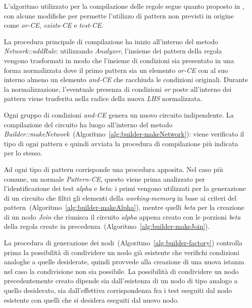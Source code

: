 L'algoritmo utilizzato per la compilazione delle regole segue quanto proposto in \cite{Doorenbos95productionmatching}, con alcune modifiche per permette l'utilizzo di pattern non previsti in origine come \emph{or-CE}, \emph{exists-CE} e \emph{test-CE}.

La procedura principale di compilazione ha inizio all'interno del metodo \emph{Network::addRule}: utilizzando \emph{Analyzer}, l'insieme dei pattern della regola vengono trasformati in modo che l'insieme di condizioni sia presentato in una forma normalizzata dove il primo pattern sia un elemento \emph{or-CE} con al suo interno almeno un elemento \emph{and-CE} che racchiuda le condizioni originali. Durante la normalizzazione, l'eventuale presenza di condizioni \emph{or} poste all'interno dei pattern viene trasferita nella radice della nuova \emph{LHS} normalizzata.



Ogni gruppo di condizioni \emph{and-CE} genera un nuovo circuito indipendente. La compilazione del circuito ha luogo all'interno del metodo \emph{Builder::makeNetwork}~(Algoritmo~\ref{alg:builder-makeNetwork}): viene verificato il tipo di ogni pattern e quindi avviata la procedura di compilazione più indicata per lo stesso.







Ad ogni tipo di pattern corrisponde una procedura apposita. Nel caso più comune, un normale \emph{Pattern-CE}, questo viene prima analizzato per l'identificazione dei test \emph{alpha} e \emph{beta}: i primi vengono utilizzati per la generazione di un circuito che filtri gli elementi della \emph{working-memory} in base ai criteri del pattern~(Algoritmo~\ref{alg:builder-makeAlpha}), mentre quelli \emph{beta} per la creazione di un nodo \emph{Join} che riunisca il circuito \emph{alpha} appena creato con le porzioni \emph{beta} della regola create in precedenza~(Algoritmo~\ref{alg:builder-makeJoin}).



La procedura di generazione dei nodi~(Algoritmo~\ref{alg:builder-factory}) controlla prima la possibilità di condividere un nodo già esistente che verifichi condizioni analoghe a quelle desiderate, quindi provvede alla creazione di una nuova istanza nel caso la condivisione non sia possibile. La possibilità di condividere un nodo precedentemente creato dipende sia dall'esistenza di un nodo di tipo analogo a quello desiderato, sia dall'effettiva corrispondenza fra i test eseguiti dal nodo esistente con quelli che si desidera eseguiti dal nuovo nodo.

